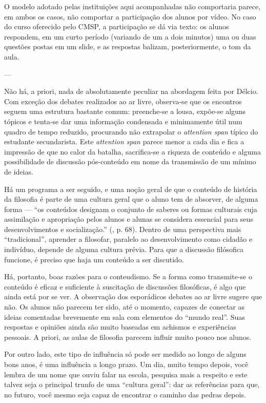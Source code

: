 \documentclass[12pt,a4paper]{article}
\begin{document}
	O modelo adotado pelas instituições aqui acompanhadas não comportaria 
	parece, em ambos os casos, não comportar a participação dos alunos por 
	vídeo. No caso do curso oferecido pelo CMSP, a participação se dá via 
	texto: os alunos respondem, em um curto período (variando de um a dois 
	minutos) uma ou duas questões postas em um slide, e as respostas 
	balizam, posteriormente, o tom da aula. 
	


---


	Não há, a priori, nada de absolutamente peculiar na abordagem feita por 
	Délcio. Com exceção dos debates realizados ao ar livre, observa-se que 
	os encontros seguem uma estrutura bastante comum: preenche-se a lousa, 
	expõe-se alguns tópicos e tenta-se dar uma informação condensada e 
	minimamente útil num quadro de tempo reduzido, procurando não extrapolar 
	o \textit{attention span} típico do estudante secundarista. Este 
	\textit{attention span} parece menor a cada dia e fica a impressão de que 
	no calor da batalha, sacrifica-se a riqueza de conteúdo e alguma 
	possibilidade de discussão pós-conteúdo em nome da transmissão de um 
	mínimo de ideias. 
	
	Há um programa a ser seguido, e uma noção geral de que o conteúdo 
	de história da filosofia é parte de uma cultura geral que o aluno tem de 
	absorver, de alguma forma --- ``os conteúdos designam o conjunto de 
	saberes ou formas culturais cuja assimilação e apropriação pelos alunos e 
	alunas se considera essencial para seus desenvolvimentos e socialização.'' 
	(\cite{obiols}, p. 68). Dentro de uma perspectiva mais ``tradicional'', 
	aprender a filosofar, paralelo ao desenvolvimento como cidadão e 
	indivíduo, depende de alguma cultura prévia. Para que a discussão 
	filósofica funcione, é preciso que haja um conteúdo a ser discutido. 
	
	Há, portanto, boas razões para o conteudismo. Se a forma como transmite-se 
	o conteúdo é eficaz e suficiente à suscitação de discussões filosóficas, é 
	algo que ainda está por se ver. A observação dos esporádicos debates ao ar 
	livre sugere que não. Os alunos não parecem ter sido, até o momento, 
	capazes de conectar as ideias comentadas brevemente em sala com elementos 
	do ``mundo real''. Suas respostas e opiniões ainda são muito baseadas em 
	achismos e experiências pessoais. A priori, as aulas de filosofia parecem 
	influir muito pouco nos alunos. 
	
	Por outro lado, este tipo de influência só pode ser medido ao longo de 
	alguns bons anos, é uma influência a longo prazo. Um dia, muito tempo 
	depois, você lembra de um nome que ouviu falar na escola, pesquisa mais a 
	respeito 	e este talvez seja o principal trunfo de uma 
	``cultura geral'': dar as referências para que, no futuro, você mesmo seja 
	capaz de encontrar o caminho das pedras depois. 
\end{document}
